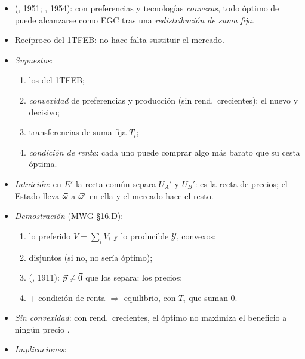 \documentclass{article}
\begin{document}
\begin{columnas}
\begin{itemize}
\item (, 1951; , 1954): con preferencias y tecnologías \emph{convexas}, todo óptimo de  puede alcanzarse como EGC tras una \emph{redistribución de suma fija}.
\item Recíproco del 1TFEB: no hace falta sustituir el mercado.
\end{itemize}
\begin{itemize}
\item \emph{Supuestos}:
  \begin{enumerate}
  \item los del 1TFEB;
  \item \emph{convexidad} de preferencias y producción (sin rend.\ crecientes): el nuevo y decisivo;
  \item transferencias de suma fija $T_i$;
  \item \emph{condición de renta}: cada uno puede comprar algo más barato que su cesta óptima.
  \end{enumerate}
\item \emph{Intuición}: en $E'$ la recta común separa $U_A'$ y $U_B'$: es la recta de precios; el Estado lleva $\vec{\omega}$ a $\vec{\omega}'$ en ella y el mercado hace el resto.
\end{itemize}
\begin{itemize}
\item \emph{Demostración} (MWG §16.D):
  \begin{enumerate}
  \item lo preferido $V=\sum_iV_i$ y lo producible $\mathcal{Y}$, convexos;
  \item disjuntos (si no, no sería óptimo);
  \item {} (, 1911): $\vec{p}\neq\vec{0}$ que los separa: los precios;
  \item {} + condición de renta $\Rightarrow$ equilibrio, con $T_i$ que suman 0.
  \end{enumerate}
\item \emph{Sin convexidad}: con rend.\ crecientes, el óptimo no maximiza el beneficio a ningún precio .
\item \emph{Implicaciones}:

\end{itemize}
\end{columnas}
\end{document}

